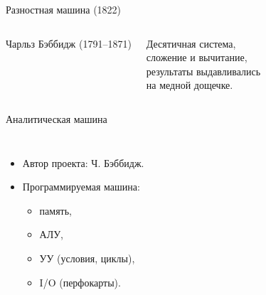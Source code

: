 \begin{frame}{Разностная машина (1822)}
    \begin{columns}
    \column{4cm}
        \begin{block}{Чарльз Бэббидж (1791–1871)}
        \end{block}

    \column{7cm}

        Десятичная система,\\
        сложение и вычитание,\\
        результаты выдавливались\\на медной дощечке.
    \end{columns}
\end{frame}

\begin{frame}{Аналитическая машина}
    \begin{columns}
    \column{4.8cm}

    \column{6.5cm}
    \begin{itemize}
    \item Автор проекта: Ч. Бэббидж.
    \item Программируемая машина:
        \begin{itemize}
            \item память, \item АЛУ,\item УУ (условия, циклы),
            \item I/O (перфокарты).
        \end{itemize}
    \end{itemize}
    \end{columns}
\end{frame}

